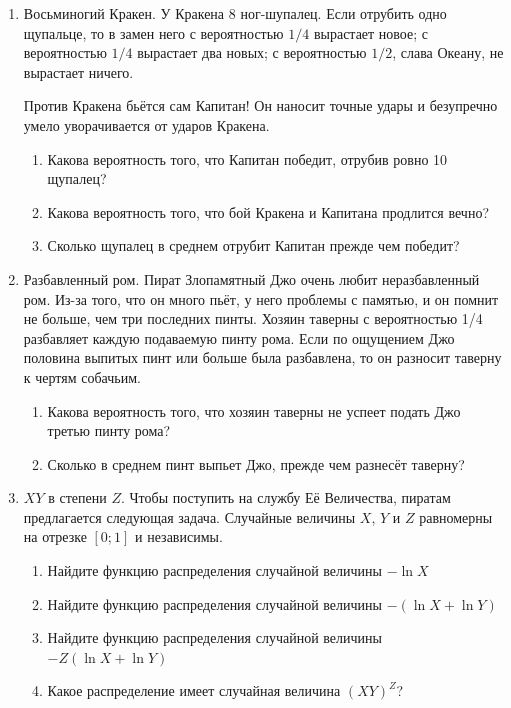 \documentclass[12pt, a4paper]{article}\usepackage[]{graphicx}\usepackage[]{color}
\begin{document}
\begin{enumerate}
\item Восьминогий Кракен. У Кракена 8 ног-шупалец. Если отрубить одно щупальце, то в замен него с вероятностью $1/4$ вырастает новое; с вероятностью $1/4$ вырастает два новых; с вероятностью $1/2$, слава Океану, не вырастает ничего.

Против Кракена бьётся сам Капитан! Он наносит точные удары и безупречно умело уворачивается от ударов Кракена.

\begin{enumerate}
\item Какова вероятность того, что Капитан победит, отрубив ровно 10 щупалец?
\item Какова вероятность того, что бой Кракена и Капитана продлится вечно?
\item Сколько щупалец в среднем отрубит Капитан прежде чем победит?
\end{enumerate}

\item Разбавленный ром. Пират Злопамятный Джо очень любит неразбавленный ром. Из-за
того, что он много пьёт, у него проблемы с памятью, и он помнит не
больше, чем три последних пинты. Хозяин таверны с вероятностью 1/4 разбавляет
каждую подаваемую пинту рома. Если по ощущением Джо половина выпитых
пинт или больше была разбавлена, то он разносит таверну к чертям
собачьим.


\begin{enumerate}
\item Какова вероятность того, что хозяин таверны не успеет подать Джо третью пинту рома?
\item Сколько в среднем пинт выпьет Джо, прежде чем разнесёт таверну?
\end{enumerate}

\item $XY$ в степени $Z$. Чтобы поступить на службу Её Величества, пиратам предлагается следующая задача. Случайные величины $X$, $Y$ и $Z$ равномерны на отрезке $[0;1]$ и независимы.

\begin{enumerate}
\item Найдите функцию распределения случайной величины $-\ln X$
\item Найдите функцию распределения случайной величины $-(\ln X + \ln Y)$
\item Найдите функцию распределения случайной величины $-Z(\ln X + \ln Y)$
\item Какое распределение имеет случайная величина $(XY)^Z$?
\end{enumerate}


\end{enumerate}
\end{document}
